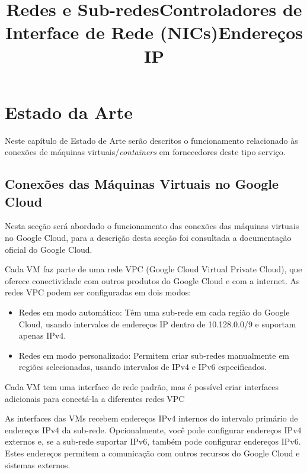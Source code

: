 \chapter{Estado da Arte}
\label{chap:art}

Neste capítulo de Estado de Arte serão descritos o funcionamento relacionado às conexões
de máquinas virtuais\slash\textit{containers} em fornecedores deste tipo serviço. \\

\section{Conexões das Máquinas Virtuais no Google Cloud}

Nesta secção será abordado o funcionamento das conexões das máquinas virtuais no Google Cloud,
para a descrição desta secção foi consultada a documentação oficial do Google Cloud. \cite{googlecloud} \\

\title*{\textbf{Redes e Sub-redes}}


Cada VM faz parte de uma rede VPC (Google Cloud Virtual Private Cloud), que oferece conectividade com outros produtos do Google Cloud e com a internet. As redes VPC podem ser configuradas em dois modos:

\begin{itemize}
\item Redes em modo automático: Têm uma sub-rede em cada região do Google Cloud, usando intervalos
de endereços IP dentro de 10.128.0.0/9 e suportam apenas IPv4.
\item Redes em modo personalizado: Permitem criar sub-redes manualmente em regiões
selecionadas, usando intervalos de IPv4 e IPv6 especificados.
\end{itemize}



\title*{\textbf{Controladores de Interface de Rede (NICs)}}

Cada VM tem uma interface de rede padrão, mas é possível criar interfaces
adicionais para conectá-la a diferentes redes VPC

\title*{\textbf{Endereços IP}}

As interfaces das VMs recebem endereços IPv4 internos do intervalo primário de 
endereços IPv4 da sub-rede. Opcionalmente, você pode configurar endereços IPv4 externos e, 
se a sub-rede suportar IPv6, também pode configurar endereços IPv6. Estes endereços permitem 
a comunicação com outros recursos do Google Cloud e sistemas externos. \\


